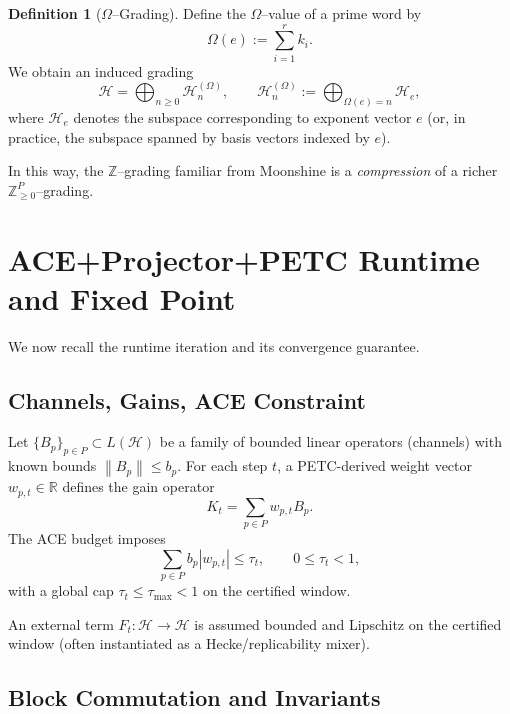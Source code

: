 \documentclass[11pt]{article}
\theoremstyle{definition}
\newtheorem{definition}{Definition}[section]
\theoremstyle{plain}
\theoremstyle{remark}
\newcommand{\Hcal}{\mathcal{H}}
\newcommand{\Zbb}{\mathbb{Z}}
\newcommand{\Rbb}{\mathbb{R}}
\newcommand{\norm}[1]{\left\lVert #1 \right\rVert}
\newcommand{\OmegaVal}{\Omega}
\begin{document}
\begin{definition}[$\OmegaVal$--Grading]
Define the $\OmegaVal$--value of a prime word by
\begin{equation}
  \OmegaVal(e) := \sum_{i=1}^r k_i.
\end{equation}
We obtain an induced grading
\begin{equation}
  \Hcal = \bigoplus_{n \ge 0} \Hcal_n^{(\OmegaVal)},\qquad
  \Hcal_n^{(\OmegaVal)} := \bigoplus_{\OmegaVal(e)=n} \Hcal_e,
\end{equation}
where $\Hcal_e$ denotes the subspace corresponding to exponent vector $e$ (or, in practice, the subspace spanned by basis vectors indexed by $e$).
\end{definition}

In this way, the $\Zbb$--grading familiar from Moonshine is a \emph{compression} of a richer $\Zbb_{\ge 0}^P$--grading.

\section{ACE+Projector+PETC Runtime and Fixed Point}

We now recall the runtime iteration and its convergence guarantee.

\subsection{Channels, Gains, ACE Constraint}

Let $\{B_p\}_{p \in P} \subset L(\Hcal)$ be a family of bounded linear operators (channels) with known bounds $\norm{B_p} \le b_p$.
For each step $t$, a PETC-derived weight vector $w_{p,t} \in \Rbb$ defines the gain operator
\begin{equation}
  K_t = \sum_{p \in P} w_{p,t} B_p.
\end{equation}
The ACE budget imposes
\begin{equation}
  \sum_{p \in P} b_p |w_{p,t}| \le \tau_t,\qquad 0 \le \tau_t < 1,
\end{equation}
with a global cap $\tau_t \le \tau_{\max} < 1$ on the certified window.

An external term $F_t : \Hcal \to \Hcal$ is assumed bounded and Lipschitz on the certified window (often instantiated as a Hecke/replicability mixer).

\subsection{Block Commutation and Invariants}
\end{document}
